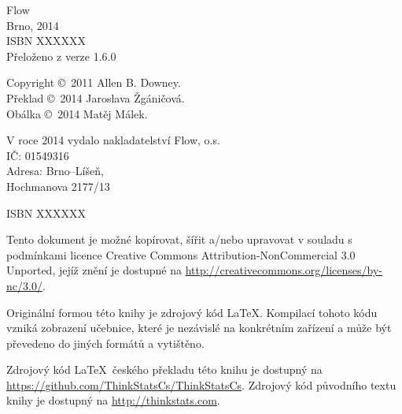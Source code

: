 \documentclass[12pt]{book}
\newcommand{\theversion}{1.6.0}
\begin{document}
\begin{latexonly}
\begin{flushright}
\vspace{1.5in}

Flow \\
Brno, 2014 \\
ISBN XXXXXX \\
Přeloženo z verze \theversion

\vfill

\end{flushright}


\pagebreak
\thispagestyle{empty}

{\small
Copyright \copyright ~2011 Allen B. Downey. \\
Překlad \copyright ~2014 Jaroslava Žgáničová. \\
Obálka \copyright ~2014 Matěj Málek.

\vspace{0.2in}

\begin{flushleft}
V roce 2014 vydalo nakladatelství Flow, o.s. \\
IČ: 01549316 \\
Adresa: Brno--Líšeň, \\
Hochmanova 2177/13 \\
\end{flushleft}

ISBN XXXXXX

Tento dokument je možné kopírovat, šířit a/nebo upravovat v souladu s podmínkami licence Creative Commons Attribution-NonCommercial 3.0 Unported, jejíž znění je dostupné na \url{http://creativecommons.org/licenses/by-nc/3.0/}.

Originální formou této knihy je zdrojový kód \LaTeX. Kompilací tohoto kódu vzniká zobrazení učebnice, které je nezávislé na konkrétním zařízení a může být převedeno do jiných formátů a vytištěno.

Zdrojový kód \LaTeX\ českého překladu této knihu je dostupný na \url{https://github.com/ThinkStatsCs/ThinkStatsCs}. Zdrojový kód původního textu knihy je dostupný na
\url{http://thinkstats.com}.


\vspace{0.2in}

} %

\end{latexonly}


\end{document}
